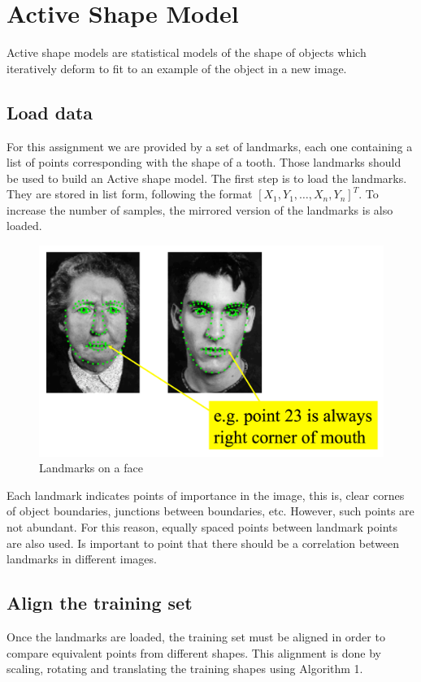 \section{Active Shape Model}

Active shape models are statistical models of the shape
of objects which iteratively deform to fit to an example
of the object in a new image.

\subsection{Load data}
For this assignment we are provided by a set of landmarks, each one
containing a list of points corresponding with the shape of a tooth.
Those landmarks should be used to build an Active shape model.
The first step is to load the landmarks. They are stored in list form,
following the format ${[X_1, Y_1, \ldots, X_n, Y_n]}^T$. To increase
the number of samples, the mirrored version of the landmarks is also
loaded.

\begin{figure}[h]
  \centering
  \includegraphics[width=0.7\linewidth]{img/landmarks}
  \caption{Landmarks on a face}
\end{figure}

Each landmark indicates points of importance in the image, this is,
clear cornes of object boundaries, junctions between boundaries, etc.
However, such points are not abundant. For this reason, equally spaced
points between landmark points are also used.
Is important to point that there should be a correlation between landmarks
in different images.

\subsection{Align the training set}
Once the landmarks are loaded, the training set must be aligned in
order to compare equivalent points from different shapes. This
alignment is done by scaling, rotating and translating the training
shapes using Algorithm 1.

